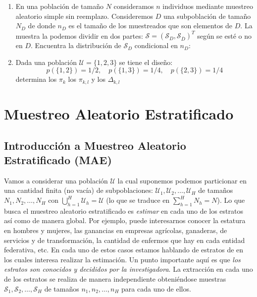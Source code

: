 \documentclass[
]{book}
\begin{document}
\begin{enumerate}
\def\labelenumi{\arabic{enumi}.}
\setcounter{enumi}{17}
\item
  En una población de tamaño \(N\) consideramos \(n\) individuos mediante muestreo aleatorio simple sin reemplazo. Consideremos \(D\) una subpoblación de tamaño \(N_D\) de donde \(n_D\) es el tamaño de los muestreados que son elementos de \(D\). La muestra la podemos dividir en dos partes: \(\mathcal{S} = (\mathcal{S}_{D}, \mathcal{S}_{\bar{D}})^T\) según se esté o no en \(D\). Encuentra la distribución de \(\mathcal{S}_{D}\) condicional en \(n_D\):
\item
  Dada una población \(\mathcal{U} = \{1,2,3\}\) se tiene el diseño:
  \[
  p(\{1,2\}) = 1/2, \quad p(\{1,3\}) = 1/4, \quad p(\{2,3\}) = 1/4
  \]
  determina los \(\pi_k\) los \(\pi_{k,l}\) y los \(\Delta_{k,l}\)
\end{enumerate}

\hypertarget{muestreo-aleatorio-estratificado}{%
\chapter{Muestreo Aleatorio Estratificado}\label{muestreo-aleatorio-estratificado}}

\hypertarget{introducciuxf3n-a-muestreo-aleatorio-estratificado-mae}{%
\section{Introducción a Muestreo Aleatorio Estratificado (MAE)}\label{introducciuxf3n-a-muestreo-aleatorio-estratificado-mae}}

Vamos a considerar una población \(\mathcal{U}\) la cual suponemos podemos particionar en una cantidad finita (no vacía) de subpoblaciones: \(\mathcal{U}_1, \mathcal{U}_2, \dots, \mathcal{U}_H\) de tamaños \(N_1, N_2, \dots, N_H\) con \(\bigcup\limits_{h=1}^H \mathcal{U}_h = \mathcal{U}\) (lo que se traduce en \(\sum_{h = 1}^H N_h = N\)). Lo que busca el muestreo aleatorio estratificado es \emph{estimar} en cada uno de los estratos así como de manera global. Por ejemplo, puede interesarnos conocer la estatura en hombres y mujeres, las ganancias en empresas agrícolas, ganaderas, de servicios y de transformación, la cantidad de enfermos que hay en cada entidad federativa, etc. En cada uno de estos casos estamos hablando de estratos de en los cuales interesa realizar la estimación. Un punto importante aquí es que \emph{los estratos son conocidos y decididos por la investigadora}. La extracción en cada uno de los estratos se realiza de manera independiente obteniéndose muestras \(\mathcal{S}_1, \mathcal{S}_2, \dots, \mathcal{S}_H\) de tamaños \(n_1, n_2, \dots, n_H\) para cada uno de ellos.
\end{document}
